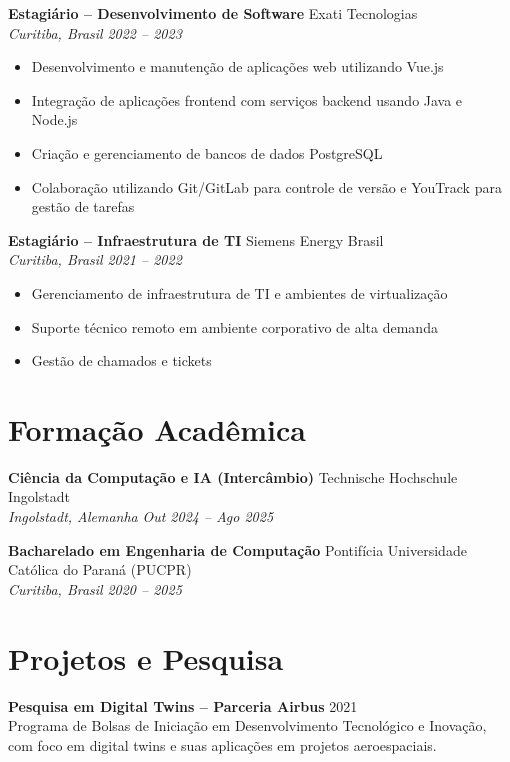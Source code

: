 \documentclass[11pt,a4paper]{article}
\newcommand{\entry}[4]{
    \textbf{#1} \hfill #2 \\
    \textit{#3} \hfill \textit{#4}
}
\begin{document}
\vspace{3pt}

\entry{Estagiário -- Desenvolvimento de Software}{Exati Tecnologias}{Curitiba, Brasil}{2022 -- 2023}
\begin{itemize}[nosep, leftmargin=*]
    \item Desenvolvimento e manutenção de aplicações web utilizando Vue.js
    \item Integração de aplicações frontend com serviços backend usando Java e Node.js
    \item Criação e gerenciamento de bancos de dados PostgreSQL
    \item Colaboração utilizando Git/GitLab para controle de versão e YouTrack para gestão de tarefas
\end{itemize}

\vspace{3pt}

\entry{Estagiário -- Infraestrutura de TI}{Siemens Energy Brasil}{Curitiba, Brasil}{2021 -- 2022}
\begin{itemize}[nosep, leftmargin=*]
    \item Gerenciamento de infraestrutura de TI e ambientes de virtualização
    \item Suporte técnico remoto em ambiente corporativo de alta demanda
    \item Gestão de chamados e tickets
\end{itemize}

\section{Formação Acadêmica}

\entry{Ciência da Computação e IA (Intercâmbio)}{Technische Hochschule Ingolstadt}{Ingolstadt, Alemanha}{Out 2024 -- Ago 2025}

\vspace{3pt}

\entry{Bacharelado em Engenharia de Computação}{Pontifícia Universidade Católica do Paraná (PUCPR)}{Curitiba, Brasil}{2020 -- 2025}

\section{Projetos e Pesquisa}

\textbf{Pesquisa em Digital Twins -- Parceria Airbus} \hfill 2021 \\
Programa de Bolsas de Iniciação em Desenvolvimento Tecnológico e Inovação, com foco em digital twins e suas aplicações em projetos aeroespaciais.
\end{document}
